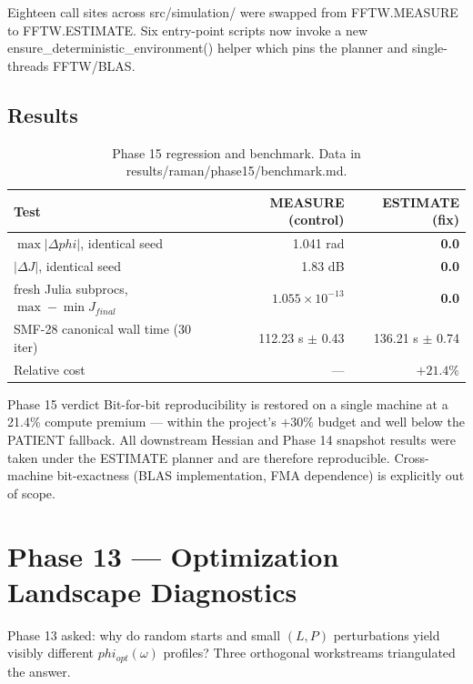 \documentclass[11pt,letterpaper]{article}
\def\varphi{phi}%
\def\mathrm#1{#1}%
\def\texttt#1{#1}%
\begin{document}
Eighteen call sites across \texttt{src/simulation/} were swapped from \texttt{FFTW.MEASURE} to \texttt{FFTW.ESTIMATE}. Six entry-point scripts now invoke a new \texttt{ensure\_deterministic\_environment()} helper which pins the planner and single-threads FFTW/BLAS.

\subsection{Results}

\begin{table}[H]
\centering
\small
\begin{tabular}{>{\raggedright\arraybackslash}p{8cm}rr}
\toprule
Test & MEASURE (control) & ESTIMATE (fix) \\
\midrule
$\max|\Delta\varphi|$, identical seed & 1.041 rad         & \textbf{0.0} \\
$|\Delta J|$, identical seed          & 1.83 dB           & \textbf{0.0} \\
3 fresh Julia subprocs, $\max - \min J_{\mathrm{final}}$ & $1.055 \times 10^{-13}$ & \textbf{0.0} \\
\midrule
SMF-28 canonical wall time (30 iter)  & 112.23 s $\pm$ 0.43 & 136.21 s $\pm$ 0.74 \\
Relative cost                          & ---                 & \textbf{$+21.4\%$} \\
\bottomrule
\end{tabular}
\caption{Phase 15 regression and benchmark. Data in \texttt{results/raman/phase15/benchmark.md}.}
\end{table}

\begin{keyfinding}{Phase 15 verdict}
Bit-for-bit reproducibility is restored on a single machine at a 21.4\% compute premium --- within the project's $+30\%$ budget and well below the \texttt{PATIENT} fallback. All downstream Hessian and Phase 14 snapshot results were taken under the ESTIMATE planner and are therefore reproducible. Cross-machine bit-exactness (BLAS implementation, FMA dependence) is explicitly out of scope.
\end{keyfinding}

\newpage
\section{Phase 13 --- Optimization Landscape Diagnostics}
\label{sec:phase13}

Phase 13 asked: why do random starts and small $(L,P)$ perturbations yield visibly different $\varphi_{\mathrm{opt}}(\omega)$ profiles? Three orthogonal workstreams triangulated the answer.
\end{document}
